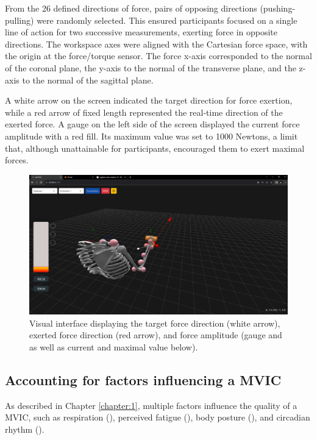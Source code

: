 From the 26 defined directions of force, pairs of opposing directions (pushing-pulling) were randomly selected. This ensured participants focused on a single line of action for two successive measurements, exerting force in opposite directions. The workspace axes were aligned with the Cartesian force space, with the origin at the force/torque sensor. The force x-axis corresponded to the normal of the coronal plane, the y-axis to the normal of the transverse plane, and the z-axis to the normal of the sagittal plane.

A white arrow on the screen indicated the target direction for force exertion, while a red arrow of fixed length represented the real-time direction of the exerted force. A gauge on the left side of the screen displayed the current force amplitude with a red fill. Its maximum value was set to 1000 Newtons, a limit that, although unattainable for participants, encouraged them to exert maximal forces.

\begin{figure}[!htb]
    \centering
    \captionsetup{justification=centering}
        \centering
        \includegraphics[trim={0 50 200 40}, clip, width=0.7\linewidth]{img/chapter_5/interface_2.png}
    \caption{Visual interface displaying the target force direction (white arrow), exerted force direction (red arrow), and force amplitude (gauge and as well as current and maximal value below).}
    \label{fig:interface_2}
\end{figure}


\subsection{Accounting for factors influencing a MVIC}

As described in Chapter \ref{chapter:1}, multiple factors influence the quality of a MVIC, such as respiration (\cite{leeComparisonMaximumVoluntary2016}), perceived fatigue (\cite{roseFatigueRecoveryStatic2014}), body posture (\cite{watanabeShortTermReliabilityGrip2005}), and circadian rhythm (\cite{jasperCircadianVariationsKinematics2009}).

